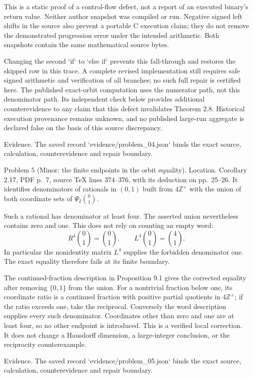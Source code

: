 \documentclass[10pt]{article}
\begin{document}
This is a static proof of a control-flow defect, not a report of an executed binary’s return value. Neither author snapshot was compiled or run. Negative signed left shifts in the source also prevent a portable C execution claim; they do not remove the demonstrated progression error under the intended arithmetic. Both snapshots contain the same mathematical source bytes.\par
Changing the second `if` to `else if` prevents this fall-through and restores the skipped row in this trace. A complete revised implementation still requires safe signed arithmetic and verification of all branches; no such full repair is certified here. The published exact-orbit computation uses the numerator path, not this denominator path. Its independent check below provides additional counterevidence to any claim that this defect invalidates Theorem 2.8. Historical execution provenance remains unknown, and no published large-run aggregate is declared false on the basis of this source discrepancy.\par
Evidence. The saved record `evidence/problem\_04.json` binds the exact source, calculation, counterevidence and repair boundary.\par
Problem 5 (Minor: the finite endpoints in the orbit equality).  Location. Corollary 2.17, PDF p. 7, source TeX lines 374–376, with its deduction on pp. 25–26. It identifies denominators of rationals in \((0,1)\) built from \(4\mathbb Z^+\) with the union of both coordinate sets of \(\Psi_2\binom{0}{1}\).\par
Such a rational has denominator at least four. The asserted union nevertheless contains zero and one. This does not rely on counting an empty word: \[R^4\binom{0}{1}=\binom{0}{1},\qquad L^4\binom{0}{1}=\binom{4}{1}.
 \tag{3.5}\] In particular the nonidentity matrix \(L^4\) supplies the forbidden denominator one. The exact equality therefore fails at its finite boundary.\par
The continued-fraction description in Proposition 9.1 gives the corrected equality after removing \(\{0,1\}\) from the union. For a nontrivial fraction below one, its coordinate ratio is a continued fraction with positive partial quotients in \(4\mathbb Z^+\); if the ratio exceeds one, take the reciprocal. Conversely the word description supplies every such denominator. Coordinates other than zero and one are at least four, so no other endpoint is introduced. This is a verified local correction. It does not change a Hausdorff dimension, a large-integer conclusion, or the reciprocity counterexample.\par
Evidence. The saved record `evidence/problem\_05.json` binds the exact source, calculation, counterevidence and repair boundary.\par
\end{document}
